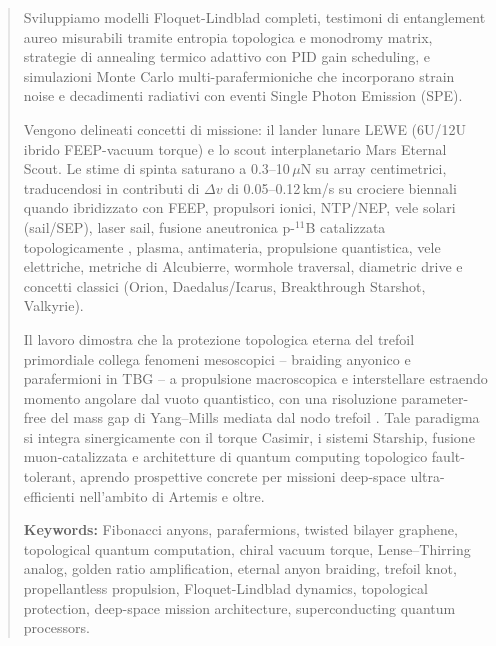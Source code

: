 \documentclass[11pt,a4paper]{article}
\let\oldcite\cite
\renewcommand{\cite}{\protect\oldcite}
\theoremstyle{plain}
\theoremstyle{definition}
\begin{document}
\begin{abstract}
Sviluppiamo modelli Floquet-Lindblad completi, testimoni di entanglement aureo misurabili tramite entropia topologica e monodromy matrix, strategie di annealing termico adattivo con PID gain scheduling, e simulazioni Monte Carlo multi-parafermioniche che incorporano strain noise e decadimenti radiativi con eventi Single Photon Emission (SPE). 


\vspace{0.3cm}

Vengono delineati concetti di missione: il lander lunare LEWE (6U/12U ibrido FEEP-vacuum torque) e lo scout interplanetario Mars Eternal Scout. Le stime di spinta saturano a 0.3--10\,$\mu$N su array centimetrici, traducendosi in contributi di $\Delta v$ di 0.05--0.12\,km/s su crociere biennali quando ibridizzato con FEEP, propulsori ionici, NTP/NEP, vele solari (sail/SEP), laser sail, fusione aneutronica p-$^{11}$B catalizzata topologicamente \cite{soliman2025p11b-topo}, plasma, antimateria, propulsione quantistica, vele elettriche, metriche di Alcubierre, wormhole traversal, diametric drive e concetti classici (Orion, Daedalus/Icarus, Breakthrough Starshot, Valkyrie).

\vspace{0.3cm}

Il lavoro dimostra che la protezione topologica eterna del trefoil primordiale collega fenomeni mesoscopici -- braiding anyonico e parafermioni in TBG \cite{Liu2025} -- a propulsione macroscopica e interstellare estraendo momento angolare dal vuoto quantistico, con una risoluzione parameter-free del mass gap di Yang--Mills mediata dal nodo trefoil \cite{soliman2026yangmills-trefoil}. Tale paradigma si integra sinergicamente con il torque Casimir, i sistemi Starship, fusione muon-catalizzata e architetture di quantum computing topologico fault-tolerant, aprendo prospettive concrete per missioni deep-space ultra-efficienti nell’ambito di Artemis e oltre.


\vspace{0.4cm}

\textbf{Keywords:} Fibonacci anyons, parafermions, twisted bilayer graphene, topological quantum computation, chiral vacuum torque, Lense--Thirring analog, golden ratio amplification, eternal anyon braiding, trefoil knot, propellantless propulsion, Floquet-Lindblad dynamics, topological protection, deep-space mission architecture, superconducting quantum processors.
\end{abstract}
\end{document}
